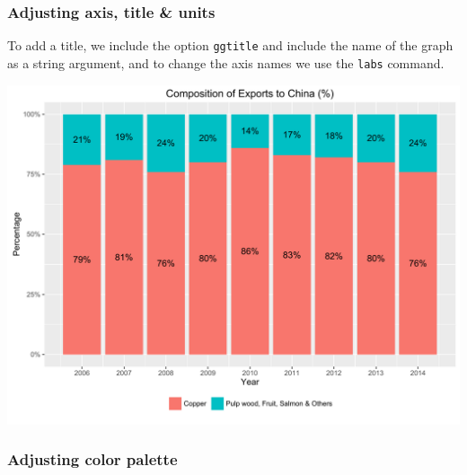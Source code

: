 \documentclass[]{article}
\newenvironment{Shaded}{\begin{snugshade}}{\end{snugshade}}
\newcommand{\KeywordTok}[1]{\textcolor[rgb]{0.13,0.29,0.53}{\textbf{{#1}}}}
\newcommand{\DataTypeTok}[1]{\textcolor[rgb]{0.13,0.29,0.53}{{#1}}}
\newcommand{\StringTok}[1]{\textcolor[rgb]{0.31,0.60,0.02}{{#1}}}
\newcommand{\NormalTok}[1]{{#1}}
\begin{document}
\subsubsection{Adjusting axis, title \&
units}\label{adjusting-axis-title-units}

To add a title, we include the option \texttt{ggtitle} and include the
name of the graph as a string argument, and to change the axis names we
use the \texttt{labs} command.

\begin{Shaded}
\end{Shaded}

\begin{center}\includegraphics{0_all_posts_pdf/stacked_7-1} \end{center}

\subsubsection{Adjusting color palette}\label{adjusting-color-palette-3}
\end{document}
